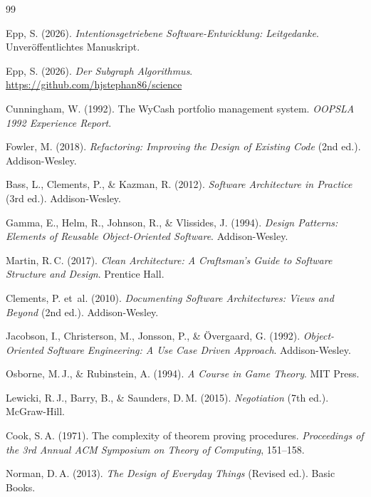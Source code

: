 ﻿\documentclass[a4paper,12pt]{article}
\theoremstyle{definition}
\begin{document}
\begin{thebibliography}{99}

Epp, S. (2026).
\textit{Intentionsgetriebene Software-Entwicklung: Leitgedanke}. Unveröffentlichtes Manuskript.

Epp, S. (2026).
\textit{Der Subgraph Algorithmus}.
\url{https://github.com/hjstephan86/science}

Cunningham, W. (1992).
The WyCash portfolio management system.
\textit{OOPSLA 1992 Experience Report}.

Fowler, M. (2018).
\textit{Refactoring: Improving the Design of Existing Code} (2nd ed.).
Addison-Wesley.

Bass, L., Clements, P., \& Kazman, R. (2012).
\textit{Software Architecture in Practice} (3rd ed.).
Addison-Wesley.

Gamma, E., Helm, R., Johnson, R., \& Vlissides, J. (1994).
\textit{Design Patterns: Elements of Reusable Object-Oriented Software}.
Addison-Wesley.

Martin, R.\,C. (2017).
\textit{Clean Architecture: A Craftsman's Guide to Software Structure
and Design}.
Prentice Hall.

Clements, P. et~al. (2010).
\textit{Documenting Software Architectures: Views and Beyond} (2nd ed.).
Addison-Wesley.

Jacobson, I., Christerson, M., Jonsson, P., \& Övergaard, G. (1992).
\textit{Object-Oriented Software Engineering: A Use Case Driven Approach}.
Addison-Wesley.

Osborne, M.\,J., \& Rubinstein, A. (1994).
\textit{A Course in Game Theory}.
MIT Press.

Lewicki, R.\,J., Barry, B., \& Saunders, D.\,M. (2015).
\textit{Negotiation} (7th ed.).
McGraw-Hill.

Cook, S.\,A. (1971).
The complexity of theorem proving procedures.
\textit{Proceedings of the 3rd Annual ACM Symposium on Theory of
Computing}, 151--158.

Norman, D.\,A. (2013).
\textit{The Design of Everyday Things} (Revised ed.).
Basic Books.


\end{thebibliography}
\end{document}
